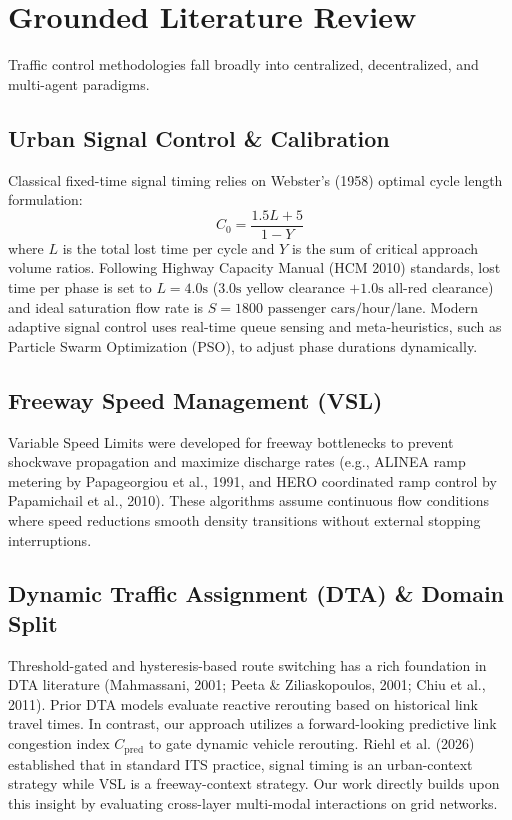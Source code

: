 \documentclass[3p,times,procedia]{elsarticle}
\begin{document}
\section{Grounded Literature Review}
\label{sec:literature}

Traffic control methodologies fall broadly into centralized, decentralized, and multi-agent paradigms.

\subsection{Urban Signal Control \& Calibration}
Classical fixed-time signal timing relies on Webster's (1958) optimal cycle length formulation:
\begin{equation}
C_0 = \frac{1.5L + 5}{1 - Y}
\end{equation}
where $L$ is the total lost time per cycle and $Y$ is the sum of critical approach volume ratios. Following Highway Capacity Manual (HCM 2010) standards, lost time per phase is set to $L = 4.0\text{s}$ ($3.0\text{s}$ yellow clearance $+ 1.0\text{s}$ all-red clearance) and ideal saturation flow rate is $S = 1800\text{ passenger cars/hour/lane}$. Modern adaptive signal control uses real-time queue sensing and meta-heuristics, such as Particle Swarm Optimization (PSO), to adjust phase durations dynamically.

\subsection{Freeway Speed Management (VSL)}
Variable Speed Limits were developed for freeway bottlenecks to prevent shockwave propagation and maximize discharge rates (e.g., ALINEA ramp metering by Papageorgiou et al., 1991, and HERO coordinated ramp control by Papamichail et al., 2010). These algorithms assume continuous flow conditions where speed reductions smooth density transitions without external stopping interruptions.

\subsection{Dynamic Traffic Assignment (DTA) \& Domain Split}
Threshold-gated and hysteresis-based route switching has a rich foundation in DTA literature (Mahmassani, 2001; Peeta \& Ziliaskopoulos, 2001; Chiu et al., 2011). Prior DTA models evaluate reactive rerouting based on historical link travel times. In contrast, our approach utilizes a forward-looking predictive link congestion index $C_{\text{pred}}$ to gate dynamic vehicle rerouting. Riehl et al. (2026) established that in standard ITS practice, signal timing is an urban-context strategy while VSL is a freeway-context strategy. Our work directly builds upon this insight by evaluating cross-layer multi-modal interactions on grid networks.
\end{document}
